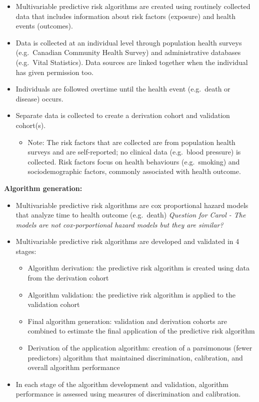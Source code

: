 \documentclass[]{book}
\providecommand{\tightlist}{%
  \setlength{\itemsep}{0pt}\setlength{\parskip}{0pt}}
\begin{document}
\begin{itemize}
\item
  Multivariable predictive risk algorithms are created using routinely
  collected data that includes information about risk factors (exposure)
  and health events (outcomes).
\item
  Data is collected at an individual level through population health
  surveys (e.g.~Canadian Community Health Survey) and administrative
  databases (e.g.~Vital Statistics). Data sources are linked together
  when the individual has given permission too.
\item
  Individuals are followed overtime until the health event (e.g.~death
  or disease) occurs.
\item
  Separate data is collected to create a derivation cohort and
  validation cohort(s).

  \begin{itemize}
  \tightlist
  \item
    Note: The risk factors that are collected are from population health
    surveys and are self-reported; no clinical data (e.g.~blood
    pressure) is collected. Risk factors focus on health behaviours
    (e.g.~smoking) and sociodemographic factors, commonly associated
    with health outcome.
  \end{itemize}
\end{itemize}

\textbf{Algorithm generation:}

\begin{itemize}
\item
  Multivariable predictive risk algorithms are cox proportional hazard
  models that analyze time to health outcome (e.g.~death) \emph{Question
  for Carol - The models are not cox-porportional hazard models but they
  are similar?}
\item
  Multivariable predictive risk algorithms are developed and validated
  in 4 stages:

  \begin{itemize}
  \tightlist
  \item
    Algorithm derivation: the predictive risk algorithm is created using
    data from the derivation cohort
  \item
    Algorithm validation: the predictive risk algorithm is applied to
    the validation cohort
  \item
    Final algorithm generation: validation and derivation cohorts are
    combined to estimate the final application of the predictive risk
    algorithm
  \item
    Derivation of the application algorithm: creation of a parsimonous
    (fewer predictors) algorithm that maintained discrimination,
    calibration, and overall algorithm performance
  \end{itemize}
\item
  In each stage of the algorithm development and validation, algorithm
  performance is assessed using measures of discrimination and
  calibration.
\end{itemize}
\end{document}

